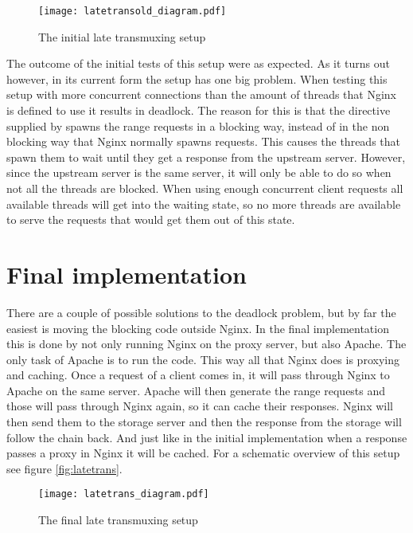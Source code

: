 \documentclass[twoside,openright]{uva-bachelor-thesis}
\begin{document}
\begin{figure}
    \texttt{[image: latetransold\_diagram.pdf]}
    \caption{The initial late transmuxing setup}\label{fig:latetransold}
\end{figure}

The outcome of the initial tests of this setup were as expected. As it turns out
however, in its current form the setup has one big problem. When testing this
setup with more concurrent connections than the amount of threads that
Nginx is defined to use it results in deadlock. The reason for this is that the
\ipplong directive supplied by \usp spawns the range requests in a blocking way,
instead of in the non blocking way that Nginx normally spawns requests. This
causes the threads that spawn them to wait until they get a response from the
upstream server. However, since the upstream server is the same server, it will
only be able to do so when not all the threads are blocked. When using enough
concurrent client requests all available threads will get into the waiting
state, so no more threads are available to serve the requests that would get
them out of this state.

\section{Final implementation}
There are a couple of possible solutions to the deadlock problem, but by far the
easiest is moving the blocking code outside Nginx. In the final implementation
this is done by not only running Nginx on the proxy server, but also Apache. The
only task of Apache is to run the \ipplong code. This way all that Nginx does is
proxying and caching. Once a request of a client comes in, it will pass
through Nginx to Apache on the same server. Apache will then generate the range
requests and those will pass through Nginx again, so it can cache their
responses. Nginx will then send them to the storage server and then the response
from the storage will follow the chain back. And just like in the initial
implementation when a response passes a proxy in Nginx it will be cached. For a
schematic overview of this setup see figure \vref{fig:latetrans}.


\begin{figure}
    \texttt{[image: latetrans\_diagram.pdf]}
    \caption{The final late transmuxing setup}\label{fig:latetrans}
\end{figure}
\end{document}

